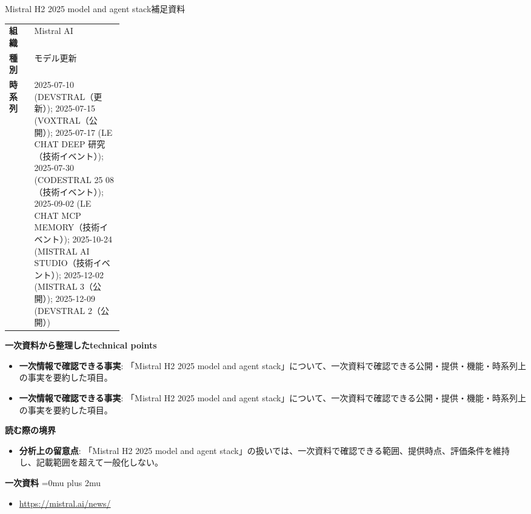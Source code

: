 \begin{technicalnote}{Mistral H2 2025 model and agent stack}{補足資料}
\begingroup
\begin{tabularx}{\linewidth}{@{}>{\bfseries}p{0.22\linewidth}X@{}}
組織 & Mistral AI \\
種別 & モデル更新 \\
時系列 & 2025-07-10 (DEVSTRAL（更新）); 2025-07-15 (VOXTRAL（公開）); 2025-07-17 (LE CHAT DEEP 研究（技術イベント）); 2025-07-30 (CODESTRAL 25 08（技術イベント）); 2025-09-02 (LE CHAT MCP MEMORY（技術イベント）); 2025-10-24 (MISTRAL AI STUDIO（技術イベント）); 2025-12-02 (MISTRAL 3（公開）); 2025-12-09 (DEVSTRAL 2（公開）) \\
\end{tabularx}
\smallskip
{\bfseries 一次資料から整理したtechnical points}
\begin{itemize}[leftmargin=1.5em,itemsep=0.35em]
\item \textbf{一次情報で確認できる事実}: 「Mistral H2 2025 model and agent stack」について、一次資料で確認できる公開・提供・機能・時系列上の事実を要約した項目。
\item \textbf{一次情報で確認できる事実}: 「Mistral H2 2025 model and agent stack」について、一次資料で確認できる公開・提供・機能・時系列上の事実を要約した項目。
\end{itemize}
\begin{minipage}{\linewidth}
{\bfseries 読む際の境界}
\begin{itemize}[leftmargin=1.5em,itemsep=0.35em]
\item \textbf{分析上の留意点}: 「Mistral H2 2025 model and agent stack」の扱いでは、一次資料で確認できる範囲、提供時点、評価条件を維持し、記載範囲を超えて一般化しない。
\end{itemize}
\begin{samepage}
{\bfseries 一次資料}
\begingroup\sloppy
\Urlmuskip=0mu plus 2mu\relax
\begin{itemize}[leftmargin=1.5em,itemsep=0.25em]
\item {\scriptsize\url{https://mistral.ai/news/}}
\end{itemize}
\endgroup
\end{samepage}
\end{minipage}
\endgroup
\end{technicalnote}
\medskip

